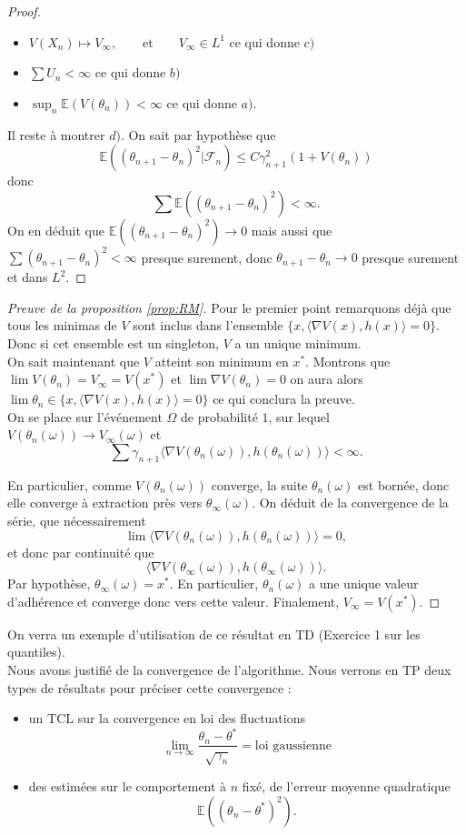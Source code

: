 \documentclass[a4paper,12pt]{book}
\newcommand{\E}{\mathbb{E}}
\newcommand{\Fc}{\mathcal{F}}
\begin{document}
\begin{proof}
\begin{itemize}
\item
$V(X_n)\mapsto V_\infty, \qquad \text{et}\qquad V_\infty \in L^1$ ce qui donne $c)$
\item $\sum U_n <\infty$ ce qui donne $b)$
\item $\sup _n \E(V(\theta_n))<\infty$ ce qui donne $a)$.
\end{itemize}
Il reste à montrer $d)$. On sait par hypothèse que
$$\E((\theta_{n+1}-\theta_n)^2\lvert \Fc_n)\le C\gamma_{n+1}^2(1+V(\theta_n))$$
donc
$$\sum \E((\theta_{n+1}-\theta_n)^2)<\infty.$$
On en déduit que $\E((\theta_{n+1}-\theta_n)^2)\to0$ mais aussi que $\sum (\theta_{n+1}-\theta_n)^2<\infty$ presque surement, donc $\theta_{n+1}-\theta_n\to 0$ presque surement et dans $L^2$.
\end{proof}


\begin{proof}
[Preuve de la proposition \ref{prop:RM}]
Pour le premier point remarquons déjà que tous les minimas de $V$ sont inclus dans l'ensemble $\{x, \langle \nabla V(x),h(x)\rangle=0\}$. Donc si cet ensemble est un singleton, $V$ a un unique minimum.\\
On sait maintenant que $V$ atteint son minimum en $x^*$. Montrons que $\lim V(\theta_n)=V_\infty=V(x^*)$ et $\lim \nabla V(\theta_n)=0$ on aura alors $\lim \theta_n\in \{x, \langle \nabla V(x),h(x)\rangle=0\}$ ce qui conclura la preuve.\\
On se place sur l'événement $\Omega$ de probabilité $1$, sur lequel $V(\theta_n(\omega))\to V_\infty(\omega)$ et $$\sum\gamma_{n+1}\langle \nabla V(\theta_n(\omega)),h(\theta_n(\omega))\rangle<\infty.$$

En particulier, comme $V(\theta_n(\omega))$ converge, la suite $\theta_n(\omega)$ est bornée, donc elle converge à extraction près vers $\theta_\infty(\omega)$. On déduit de la convergence de la série, que nécessairement
$$\lim \langle \nabla V(\theta_n(\omega)),h(\theta_n(\omega))\rangle=0,$$
et donc par continuité que
$$\langle \nabla V(\theta_\infty(\omega)),h(\theta_\infty(\omega))\rangle.$$
Par hypothèse, $\theta_\infty(\omega)=x^*.$ En particulier, $\theta_n(\omega)$ a une unique valeur d'adhérence et converge donc vers cette valeur. Finalement, $V_\infty=V(x^*)$.
\end{proof}
On verra un exemple d'utilisation de ce résultat en TD (Exercice 1 sur les quantiles).\\

Nous avons justifié de la convergence de l'algorithme. Nous verrons en TP deux types de résultats pour préciser cette convergence : \begin{itemize}
\item un TCL sur la convergence en loi des fluctuations
$$\lim_{n\to\infty} \frac{\theta_n-\theta^*}{\sqrt{\gamma_n}} = \text{loi gaussienne}$$
\item des estimées sur le comportement à $n$ fixé, de l'erreur moyenne quadratique $$\E((\theta_n-\theta^*)^2).$$
\end{itemize}

%
\end{document}
